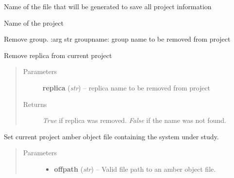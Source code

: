 \documentclass[letterpaper,10pt,english]{sphinxmanual}
\begin{document}
\begin{fulllineitems}
\begin{fulllineitems}
\label{project:pyMDMix.Project.Project.projFileName}
Name of the file that will be generated to save all project information

\end{fulllineitems}


\begin{fulllineitems}
\label{project:pyMDMix.Project.Project.projName}
Name of the project

\end{fulllineitems}


\begin{fulllineitems}
\label{project:pyMDMix.Project.Project.removeGroup}
Remove group.
:arg str groupname: group name to be removed from project

\end{fulllineitems}


\begin{fulllineitems}
\label{project:pyMDMix.Project.Project.removeReplica}
Remove replica from current project
\begin{quote}\begin{description}
\item[{Parameters}] \leavevmode
\textbf{replica} (\emph{str}) -- replica name to be removed from project

\item[{Returns}] \leavevmode
\emph{True} if replica was removed. \emph{False} if the name was not found.

\end{description}\end{quote}

\end{fulllineitems}


\begin{fulllineitems}
\label{project:pyMDMix.Project.Project.setOFF}
Set current project amber object file containing the system under study.
\begin{quote}\begin{description}
\item[{Parameters}] \leavevmode\begin{itemize}
\item {} 
\textbf{offpath} (\emph{str}) -- Valid file path to an amber object file.


\end{itemize}
\end{description}
\end{quote}
\end{fulllineitems}
\end{fulllineitems}
\end{document}
